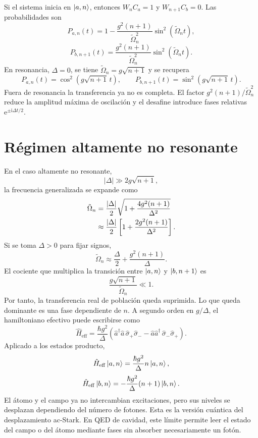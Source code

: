 \documentclass[11pt]{article}
\newcommand{\ii}{\mathrm{i}}
\newcommand{\ee}{\mathrm{e}}
\newcommand{\adag}{\hat a^\dagger}
\newcommand{\sigmap}{\hat\sigma_+}
\newcommand{\sigmam}{\hat\sigma_-}
\newcommand{\Omn}{\tilde\Omega_n}
\begin{document}
Si el sistema inicia en $\ket{a,n}$, entonces $W_nC_a=1$ y
$W_{n+1}C_b=0$. Las probabilidades son
\begin{equation}
  P_{a,n}(t)
  =
  1
  -
  \frac{g^2(n+1)}{\Omn^2}\sin^2(\Omn t),
\end{equation}
\begin{equation}
  P_{b,n+1}(t)
  =
  \frac{g^2(n+1)}{\Omn^2}\sin^2(\Omn t).
\end{equation}
En resonancia, $\Delta=0$, se tiene $\Omn=g\sqrt{n+1}$ y se recupera
\begin{equation}
  P_{a,n}(t)=\cos^2(g\sqrt{n+1}\,t),
  \qquad
  P_{b,n+1}(t)=\sin^2(g\sqrt{n+1}\,t).
\end{equation}
Fuera de resonancia la transferencia ya no es completa. El factor
$g^2(n+1)/\Omn^2$ reduce la amplitud m\'axima de oscilaci\'on y el desafine
introduce fases relativas $\ee^{\pm \ii\Delta t/2}$.

\section{R\'egimen altamente no resonante}

En el caso altamente no resonante,
\begin{equation}
  |\Delta|\gg 2g\sqrt{n+1},
\end{equation}
la frecuencia generalizada se expande como
\begin{align}
  \Omn
  &=
  \frac{|\Delta|}{2}
  \sqrt{1+\frac{4g^2(n+1)}{\Delta^2}}
  \notag\\
  &\approx
  \frac{|\Delta|}{2}
  \left[
  1+\frac{2g^2(n+1)}{\Delta^2}
  \right].
\end{align}
Si se toma $\Delta>0$ para fijar signos,
\begin{equation}
  \Omn\approx\frac{\Delta}{2}+\frac{g^2(n+1)}{\Delta}.
\end{equation}
El cociente que multiplica la transici\'on entre $\ket{a,n}$ y
$\ket{b,n+1}$ es
\begin{equation}
  \frac{g\sqrt{n+1}}{\Omn}\ll1.
\end{equation}
Por tanto, la transferencia real de poblaci\'on queda suprimida. Lo que queda
dominante es una fase dependiente de $n$. A segundo orden en $g/\Delta$, el
hamiltoniano efectivo puede escribirse como
\begin{equation}
  \boxed{
  \hat H_{\mathrm{eff}}
  =
  \frac{\hbar g^2}{\Delta}
  \left(
  \adag\hat a\,\sigmap\sigmam
  -
  \hat a\adag\,\sigmam\sigmap
  \right).
  }
\end{equation}
Aplicado a los estados producto,
\begin{equation}
  \hat H_{\mathrm{eff}}\ket{a,n}
  =
  \frac{\hbar g^2}{\Delta}n\ket{a,n},
\end{equation}
\begin{equation}
  \hat H_{\mathrm{eff}}\ket{b,n}
  =
  -\frac{\hbar g^2}{\Delta}(n+1)\ket{b,n}.
\end{equation}
El \'atomo y el campo ya no intercambian excitaciones, pero sus niveles se
desplazan dependiendo del n\'umero de fotones. Esta es la versi\'on cu\'antica
del desplazamiento ac-Stark. En QED de cavidad, este l\'imite permite leer el
estado del campo o del \'atomo mediante fases sin absorber necesariamente un
fot\'on.
\end{document}
